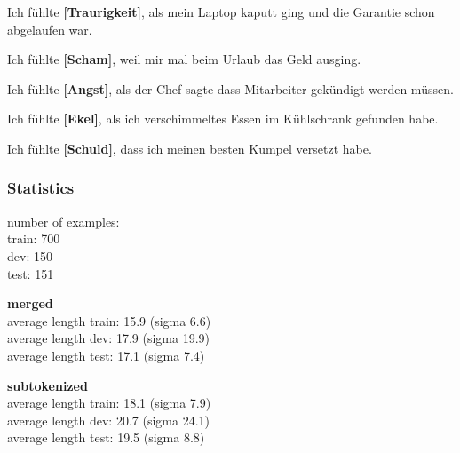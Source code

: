 \begin{examples}
  \item Ich fühlte \textbf{[Traurigkeit]}, als mein Laptop kaputt ging und die Garantie schon abgelaufen war.
\end{examples}
\begin{examples}
  \label{ex:deisear}
  \item  Ich fühlte \textbf{[Scham]}, weil mir mal beim Urlaub das Geld ausging.
\end{examples}
\begin{examples}
  \label{ex:deisear}
  \item Ich fühlte \textbf{[Angst]}, als der Chef sagte dass Mitarbeiter gekündigt werden müssen.
\end{examples}
\begin{examples}
  \label{ex:deisear}
  \item Ich fühlte \textbf{[Ekel]}, als ich verschimmeltes Essen im Kühlschrank gefunden habe.
\end{examples}
\begin{examples}
  \label{ex:deisear}
  \item Ich fühlte \textbf{[Schuld]}, dass ich meinen besten Kumpel versetzt habe.
\end{examples}



\subsubsection{Statistics}

number of examples: \\
train: 700 \\
dev: 150 \\
test: 151

\textbf{merged} \\
average length train: 15.9 (sigma 6.6) \\
average length dev: 17.9 (sigma 19.9) \\
average length test: 17.1 (sigma 7.4)

\textbf{subtokenized} \\
average length train: 18.1 (sigma 7.9) \\
average length dev: 20.7 (sigma 24.1) \\
average length test: 19.5 (sigma 8.8)

